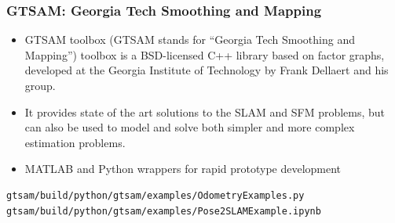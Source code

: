 \begin{frame}[fragile]
    \frametitle{GTSAM: Georgia Tech Smoothing and Mapping}

    \begin{itemize}
        \item GTSAM toolbox (GTSAM stands for ``Georgia Tech Smoothing and Mapping'') toolbox is a BSD-licensed C++ library based on factor graphs, developed at the Georgia Institute of Technology by Frank Dellaert and his group.
        \item It provides state of the art solutions to the SLAM and SFM problems, but can also be used to model and solve both simpler and more complex estimation problems.
        \item MATLAB and Python wrappers for rapid prototype development
    \end{itemize}


\begin{lstlisting}[style=bash] 
gtsam/build/python/gtsam/examples/OdometryExamples.py
gtsam/build/python/gtsam/examples/Pose2SLAMExample.ipynb
\end{lstlisting}

\end{frame}

